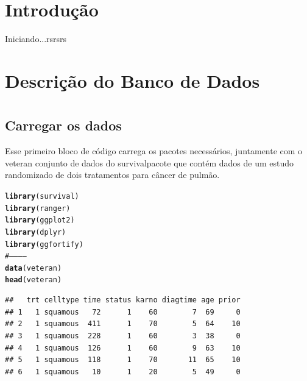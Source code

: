 \documentclass[a4paper, oneside]{book}\usepackage[]{graphicx}\usepackage[]{color}
\makeatletter
\newcommand{\hlcom}[1]{\textcolor[rgb]{0.678,0.584,0.686}{\textit{#1}}}%
\newcommand{\hlstd}[1]{\textcolor[rgb]{0.345,0.345,0.345}{#1}}%
\newcommand{\hlkwd}[1]{\textcolor[rgb]{0.737,0.353,0.396}{\textbf{#1}}}%
\newenvironment{kframe}{%
 \def\at@end@of@kframe{}%
 \ifinner\ifhmode%
  \def\at@end@of@kframe{\end{minipage}}%
  \begin{minipage}{\columnwidth}%
 \fi\fi%
 \def\FrameCommand##1{\hskip\@totalleftmargin \hskip-\fboxsep
 \colorbox{shadecolor}{##1}\hskip-\fboxsep
     \hskip-\linewidth \hskip-\@totalleftmargin \hskip\columnwidth}%
 \MakeFramed {\advance\hsize-\width
   \@totalleftmargin\z@ \linewidth\hsize
   \@setminipage}}%
 {\par\unskip\endMakeFramed%
 \at@end@of@kframe}
\newenvironment{knitrout}{}{} %
\makeatother
\begin{document}





\tableofcontents 	

\listoffigures %




  \chapter{Introdução}
  
Iniciando...rsrsrs


  \chapter{Descrição do Banco de Dados}
  

  
  
  \chapter{}
  
    \section{Carregar os dados}
    
Esse primeiro bloco de código carrega os pacotes necessários, juntamente com o veteran conjunto de dados do survivalpacote que contém dados de um estudo randomizado de dois tratamentos para câncer de pulmão.

\begin{knitrout}
\color{fgcolor}\begin{kframe}
\begin{alltt}
\hlkwd{library}\hlstd{(survival)}
\hlkwd{library}\hlstd{(ranger)}
\hlkwd{library}\hlstd{(ggplot2)}
\hlkwd{library}\hlstd{(dplyr)}
\hlkwd{library}\hlstd{(ggfortify)}
\hlcom{#------------}
\hlkwd{data}\hlstd{(veteran)}
\hlkwd{head}\hlstd{(veteran)}
\end{alltt}
\begin{verbatim}
##   trt celltype time status karno diagtime age prior
## 1   1 squamous   72      1    60        7  69     0
## 2   1 squamous  411      1    70        5  64    10
## 3   1 squamous  228      1    60        3  38     0
## 4   1 squamous  126      1    60        9  63    10
## 5   1 squamous  118      1    70       11  65    10
## 6   1 squamous   10      1    20        5  49     0
\end{verbatim}
\end{kframe}
\end{knitrout}
\end{document}
